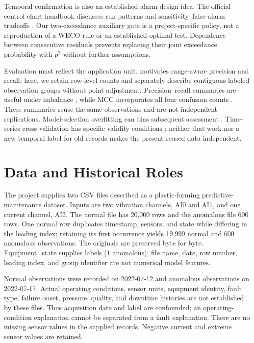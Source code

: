\documentclass{article}
\begin{document}
Temporal confirmation is also an established alarm-design idea. The official control-chart handbook discusses run patterns and sensitivity--false-alarm tradeoffs \citep{nist}. Our two-exceedance auxiliary gate is a project-specific policy, not a reproduction of a WECO rule or an established optimal test. Dependence between consecutive residuals prevents replacing their joint exceedance probability with $p^2$ without further assumptions.

Evaluation must reflect the application unit. \citet{tatbul2018} motivates range-aware precision and recall; here, we retain row-level counts and separately describe contiguous labeled observation groups without point adjustment. Precision--recall summaries are useful under imbalance \citep{saito2015}, while MCC incorporates all four confusion counts \citep{chicco2020}. These summaries reuse the same observations and are not independent replications. Model-selection overfitting can bias subsequent assessment \citep{cawley2010}. Time-series cross-validation has specific validity conditions \citep{bergmeir2018}; neither that work nor a new temporal label for old records makes the present reused data independent.

\section{Data and Historical Roles}
The project supplies two CSV files described as a plastic-forming predictive-maintenance dataset. Inputs are two vibration channels, AI0 and AI1, and one current channel, AI2. The normal file has 20,000 rows and the anomalous file 600 rows. One normal row duplicates timestamp, sensors, and state while differing in the leading index; retaining its first occurrence yields 19,999 normal and 600 anomalous observations. The originals are preserved byte for byte. Equipment\_state supplies labels ($1$ anomalous); file name, date, row number, leading index, and group identifier are not numerical model features.

Normal observations were recorded on 2022-07-12 and anomalous observations on 2022-07-17. Actual operating conditions, sensor units, equipment identity, fault type, failure onset, pressure, quality, and downtime histories are not established by these files. Thus acquisition date and label are confounded; an operating-condition explanation cannot be separated from a fault explanation. There are no missing sensor values in the supplied records. Negative current and extreme sensor values are retained.
\end{document}
